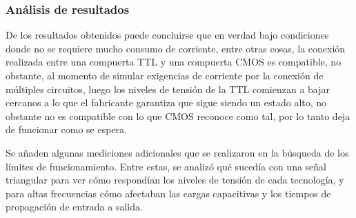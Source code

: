 \subsubsection{An\'alisis de resultados}
De los resultados obtenidos puede concluirse que en verdad bajo condiciones donde no se requiere mucho consumo de corriente, entre otras cosas,
la conexi\'on realizada entre una compuerta TTL y una compuerta CMOS es compatible, no obstante, al momento de simular exigencias de corriente por la conexi\'on
de m\'ultiples circuitos, luego los niveles de tensi\'on de la TTL comienzan a bajar cercanos a lo que el fabricante garantiza que sigue siendo un estado alto,
no obstante no es compatible con lo que CMOS reconoce como tal, por lo tanto deja de funcionar como se espera.

Se a\~naden algunas mediciones adicionales que se realizaron en la b\'usqueda de los l\'imites de funcionamiento. Entre estas, se analiz\'o qu\'e suced\'ia
con una se\~nal triangular para ver c\'omo respond\'ian los niveles de tensi\'on de cada tecnolog\'ia, y para altas frecuencias c\'omo afectaban las cargas capacitivas
y los tiempos de propagaci\'on de entrada a salida.

